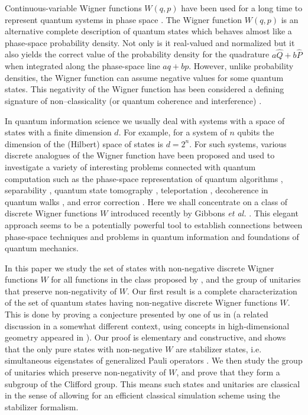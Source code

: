 \documentclass[aps,twocolumn,showpacs,nofootinbib,superscriptaddress]{revtex4}
\begin{document}
Continuous-variable Wigner functions $W(q,p)$ have been used for a long time
to represent quantum systems in phase space \cite{Wigner32, HilleryOSW84}.
The Wigner function $W(q,p)$ is an alternative complete description of quantum
states which behaves almost like a phase-space probability density. Not only is
it real-valued and normalized but it also yields the correct value of the
probability density for the quadrature $a\hat Q+b\hat P$ when integrated along
the phase-space line $aq+bp$. However, unlike probability densities, the Wigner
function can assume negative values for some quantum states. This negativity of
the Wigner function has been considered a defining signature of non--classicality
(or quantum coherence and interference)
\cite{Zurek03, PazZ00}.

In quantum information science we usually deal with systems with a
space of states with a finite dimension $d$. For example, for a
system of $n$ qubits the dimension of the (Hilbert) space of
states is $d=2^n$. For such systems, various discrete analogues of
the Wigner function have been proposed \cite{Buot74, HannayB80,
CohenS86, Feynman87, Wootters87, GalettiP88, GibbonsHW04} and used
to investigate a variety of interesting problems connected with
quantum computation such as the phase-space representation of
quantum algorithms \cite{MiquelPS02}, separability
\cite{PittengerR05}, quantum state tomography
\cite{Wootters04,PazRS04}, teleportation \cite{KoniorczykBJ01,
Paz02}, decoherence in quantum walks \cite{LopezP03},
 and error correction \cite{PazRS04b}.
Here we shall concentrate on a class of discrete Wigner functions $W$ introduced
recently by Gibbons \textit{et al.} \cite{GibbonsHW04}. This elegant approach seems
to be a potentially powerful tool to establish connections between phase-space
techniques and problems in quantum information and foundations of quantum mechanics.

In this paper we study the set of states with non-negative discrete Wigner functions
$W$ for all functions in the class proposed by \cite{GibbonsHW04}, and the group of
unitaries that preserve non-negativity of $W$. Our first result is a complete
characterization of the set of quantum states having non-negative discrete Wigner
functions $W$. This is done by proving a conjecture presented by one of us in
\cite{Galvao05} (a related discussion in a somewhat different context,
using concepts in high-dimensional geometry appeared in
\cite{Bengtsson04,BengtssonE04}). Our proof is elementary and constructive, and
shows that the only pure states with non-negative $W$ are stabilizer states, i.e. simultaneous eigenstates of generalized Pauli operators \cite{Gottesman97}. We
then study the group of unitaries which preserve non-negativity of $W$, and prove
that they form a subgroup of the Clifford group. This means such states and unitaries
are classical in the sense of allowing for an efficient classical simulation
scheme using the stabilizer formalism.
\end{document}
